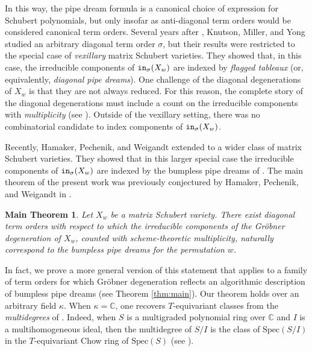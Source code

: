 \documentclass[12pt,reqno]{amsart}
\newtheorem{Main Conjecture}[theorem]{Main Conjecture}
\theoremstyle{remark}
\theoremstyle{plain}
\newtheorem*{MainThm}{Main Theorem}
\newcommand{\notdefterm}[1]{\emph{#1}}
\newcommand{\init}{{\tt in}}
\newcommand{\CC}{\mathbb{C}}
\newcommand{\spec}{{\mbox{Spec}}}
\begin{document}
In this way, the pipe dream formula is a canonical choice of expression for Schubert polynomials, but only insofar as anti-diagonal term orders would be considered canonical term orders. Several years after \cite{KM05}, Knutson, Miller, and Yong \cite{KMY09} studied an arbitrary diagonal term order $\sigma$, but their results were restricted to the special case of \emph{vexillary} matrix Schubert varieties. They showed that, in this case, the irreducible components of $\init_\sigma(X_w)$ are indexed by \notdefterm{flagged tableaux} (or, equivalently, \notdefterm{diagonal pipe dreams}).  One  challenge of the diagonal degenerations of $X_w$ is that they are not always reduced.  For this reason, the complete story of the diagonal degenerations must include a count on the irreducible components with \emph{multiplicity} (see \cite[Chapter 12]{Eis95}). Outside of the vexillary setting, there was no combinatorial candidate  to index components of $\init_\sigma(X_w)$.
 
Recently, Hamaker, Pechenik, and Weigandt \cite{HPW} extended \cite{KMY09} to a wider class of matrix Schubert varieties.  They showed that in this larger special case the irreducible components of $\init_\sigma(X_w)$ are indexed by the bumpless pipe dreams of \cite{LLS21}.  The main theorem of the present work was previously conjectured by Hamaker, Pechenik, and Weigandt in \cite[Conjecture 1.2]{HPW}.


\begin{MainThm} Let $X_w$ be a matrix Schubert variety.  There exist diagonal term orders with respect to which the irreducible components of the Gr\"obner degeneration of $X_w$, counted with scheme-theoretic multiplicity, naturally correspond to the bumpless pipe dreams for the permutation $w$.
\end{MainThm}



In fact, we prove a more general version of this statement that applies to a family of term orders for which Gr\"obner degeneration reflects an algorithmic description of bumpless pipe dreams (see Theorem \ref{thm:main}).  Our theorem holds over an arbitrary field $\kappa$.  When $\kappa = \CC$, one recovers $T$-equivariant classes from the \notdefterm{multidegrees} of \cite{Jos84,Ros89}. Indeed, when $S$ is a multigraded polynomial ring over $\CC$ and $I$ is a multihomogeneous ideal, then the multidegree of $S/I$ is the class of $\spec(S/I)$ in the $T$-equivariant Chow ring of $\spec(S)$ (see \cite[Proposition~1.19]{KMS06}).  
\end{document}

